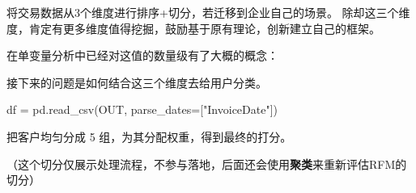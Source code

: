 \documentclass[
]{ctexart}
\newenvironment{Shaded}{\begin{snugshade}}{\end{snugshade}}
\newcommand{\NormalTok}[1]{\textcolor[rgb]{0.00,0.23,0.31}{#1}}
\newcommand{\OperatorTok}[1]{\textcolor[rgb]{0.37,0.37,0.37}{#1}}
\newcommand{\StringTok}[1]{\textcolor[rgb]{0.13,0.47,0.30}{#1}}
\begin{document}
将交易数据从3个维度进行排序+切分，若迁移到企业自己的场景。
除却这三个维度，肯定有更多维度值得挖掘，鼓励基于原有理论，创新建立自己的框架。

在单变量分析中已经对这值的数量级有了大概的概念：

接下来的问题是如何结合这三个维度去给用户分类。

\begin{Shaded}
\begin{Highlighting}[]
\NormalTok{df }\OperatorTok{=}\NormalTok{ pd.read\_csv(OUT,}
\NormalTok{                 parse\_dates}\OperatorTok{=}\NormalTok{[}\StringTok{"InvoiceDate"}\NormalTok{])}
\end{Highlighting}
\end{Shaded}

把客户均匀分成 5 组，为其分配权重，得到最终的打分。

（这个切分仅展示处理流程，不参与落地，后面还会使用\textbf{聚类}来重新评估RFM的切分）
\end{document}
